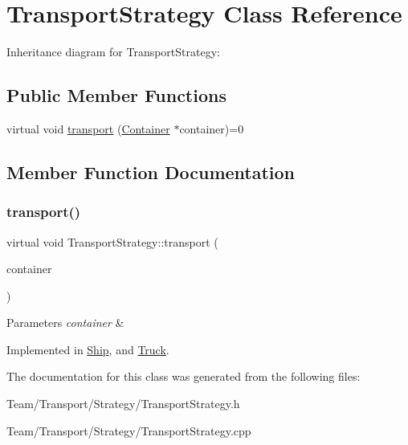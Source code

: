 \hypertarget{classTransportStrategy}{}\section{Transport\+Strategy Class Reference}
\label{classTransportStrategy}


Inheritance diagram for Transport\+Strategy\+:
\subsection*{Public Member Functions}
\begin{DoxyCompactItemize}
\item 
virtual void \hyperlink{classTransportStrategy_ab5659f9d5d352ba0a23f1e99edd3d488}{transport} (\hyperlink{classContainer}{Container} $\ast$container)=0
\end{DoxyCompactItemize}


\subsection{Member Function Documentation}
\mbox{\label{classTransportStrategy_ab5659f9d5d352ba0a23f1e99edd3d488}} 
\subsubsection{\texorpdfstring{transport()}{transport()}}
{\footnotesize\ttfamily virtual void Transport\+Strategy\+::transport (\begin{DoxyParamCaption}\item[{\hyperlink{classContainer}{Container} $\ast$}]{container }\end{DoxyParamCaption})\hspace{0.3cm}{\ttfamily [pure virtual]}}


\begin{DoxyParams}{Parameters}
{\em container} & \\
\hline
\end{DoxyParams}


Implemented in \hyperlink{classShip_a8b60ca34490dd8ef1c93888fa61c9472}{Ship}, and \hyperlink{classTruck_a260ad20acea80d5b4faa2a9d97eaa8e9}{Truck}.



The documentation for this class was generated from the following files\+:\begin{DoxyCompactItemize}
\item 
Team/\+Transport/\+Strategy/Transport\+Strategy.\+h\item 
Team/\+Transport/\+Strategy/Transport\+Strategy.\+cpp\end{DoxyCompactItemize}
